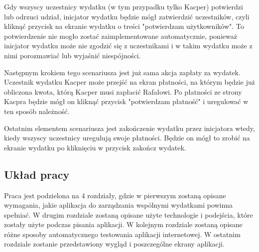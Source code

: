 Gdy wszyscy uczestnicy wydatku (w tym przypadku tylko Kacper) potwierdzi lub odrzuci udział, inicjator wydatku będzie mógł zatwierdzić uczestników, czyli kliknąć przycisk na ekranie wydatku o treści "potwierdzam użytkowników". To potwierdzenie nie mogło zostać zaimplementowane automatycznie, ponieważ inicjator wydatku może nie zgodzić się z uczestnikami i w takim wydatku może z nimi porozmawiać lub wyjaśnić niespójności.

Następnym krokiem tego scenariusza jest już sama akcja zapłaty za wydatek. Uczestnik wydatku Kacper może przejść na ekran płatności, na którym będzie już obliczona kwota, którą Kacper musi zapłacić Rafałowi. Po płatności ze strony Kacpra będzie mógł on kliknąć przycisk "potwierdzam płatność" i uregulować w ten sposób należność.

Ostatnim elementem scenariusza jest zakończenie wydatku przez inicjatora wtedy, kiedy wszyscy uczestnicy uregulują swoje płatności. Będzie on mógł to zrobić na ekranie wydatku po kliknięciu w przycisk zakończ wydatek.

\subsection{Układ pracy}
Praca jest podzielona na 4 rozdziały, gdzie w pierwszym zostaną opisane wymagania, jakie aplikacja do zarządzania wspólnymi wydatkami powinna spełniać. W drugim rozdziale zostaną opisane użyte technologie i podejścia, które zostały użyte podczas pisania aplikacji. W kolejnym rozdziale zostaną opisane różne sposoby automatycznego testowania aplikacji internetowej. W ostatnim rozdziale zostanie przedstawiony wygląd i poszczególne ekrany aplikacji.


